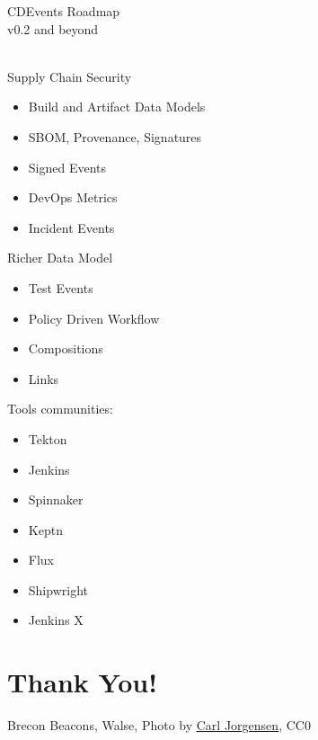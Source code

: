 \documentclass[aspectratio=169,11pt,hyperref={colorlinks=true}]{beamer}
\begin{document}
\begin{stripedframe}%
  {%
  CDEvents Roadmap \\
  v0.2 and beyond \\
  ~
  }%
  {%
  Supply Chain Security
  \begin{itemize}
    \item Build and Artifact Data Models
    \item SBOM, Provenance, Signatures
  \end{itemize}
  \begin{itemize}
    \item Signed Events
  \end{itemize}
  }%
  {%
  \begin{itemize}
    \item DevOps Metrics
    \item Incident Events
  \end{itemize}
  }%
  {%
  Richer Data Model
  \begin{itemize}
    \item Test Events
    \item Policy Driven Workflow
    \item Compositions
    \item Links
  \end{itemize}
  }%
  {%
  Tools communities:
  \begin{itemize}
    \item Tekton
    \item Jenkins
    \item Spinnaker
    \item Keptn
    \item Flux
    \item Shipwright
    \item Jenkins X
  \end{itemize}
  }%
\end{stripedframe}

\section[Thank You]{Thank You!}

\begin{sectionwithpiclargecentral}{Brecon Beacons, Walse, Photo by \href{https://unsplash.com/@scamartist}{\underline{Carl Jorgensen}}, CC0}
\end{sectionwithpiclargecentral}
\end{document}
